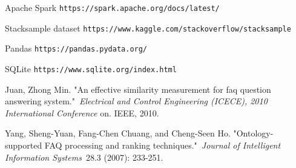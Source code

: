 \documentclass{article}
\begin{document}
\begin{thebibliography}{1}
	
	 Apache Spark \texttt{https://spark.apache.org/docs/latest/}
	
	 Stacksample dataset \texttt{https://www.kaggle.com/stackoverflow/stacksample}
	
	 Pandas \texttt{https://pandas.pydata.org/} 
	
	 SQLite \texttt{https://www.sqlite.org/index.html}
	
	 Juan, Zhong Min. "An effective similarity measurement for faq question answering system." \textit{Electrical and Control Engineering (ICECE), 2010 International Conference} on. IEEE, 2010.
	
	 Yang, Sheng-Yuan, Fang-Chen Chuang, and Cheng-Seen Ho. "Ontology-supported FAQ processing and ranking techniques." \textit{Journal of Intelligent Information Systems} 28.3 (2007): 233-251.
	
\end{thebibliography}
\end{document}
